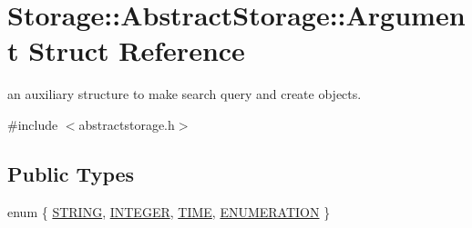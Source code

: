 \hypertarget{structStorage_1_1AbstractStorage_1_1Argument}{
\section{Storage::AbstractStorage::Argument Struct Reference}
\label{d9/dc9/structStorage_1_1AbstractStorage_1_1Argument}
}


an auxiliary structure to make search query and create objects.  




{\ttfamily \#include $<$abstractstorage.h$>$}

\subsection*{Public Types}
\begin{DoxyCompactItemize}
\item 
enum \{ \hyperlink{structStorage_1_1AbstractStorage_1_1Argument_a92adab5cf7e02947e2e75fba5e11446ca3268a68276a4ac73701de323858c945b}{STRING}, 
\hyperlink{structStorage_1_1AbstractStorage_1_1Argument_a92adab5cf7e02947e2e75fba5e11446ca4f57d3a5ac601598730fb58b08c81540}{INTEGER}, 
\hyperlink{structStorage_1_1AbstractStorage_1_1Argument_a92adab5cf7e02947e2e75fba5e11446ca6f9cbb024f036014248e8322253da11e}{TIME}, 
\hyperlink{structStorage_1_1AbstractStorage_1_1Argument_a92adab5cf7e02947e2e75fba5e11446ca37240303f27a558e24e9e07d1abfa215}{ENUMERATION}
 \}
\end{DoxyCompactItemize}
